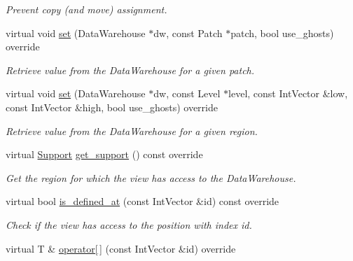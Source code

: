 \begin{DoxyCompactItemize}
\begin{DoxyCompactList}\small\item\em Prevent copy (and move) assignment. \end{DoxyCompactList}\item 
virtual void \hyperlink{classUintah_1_1PhaseField_1_1detail_1_1dw__fd_3_01ScalarField_3_01T_01_4_00_01STN_00_01VAR_00_011_01_4_ae718a5d7a2210592ec2b5dbd7eab1ace}{set} (Data\+Warehouse $\ast$dw, const Patch $\ast$patch, bool use\+\_\+ghosts) override
\begin{DoxyCompactList}\small\item\em Retrieve value from the Data\+Warehouse for a given patch. \end{DoxyCompactList}\item 
virtual void \hyperlink{classUintah_1_1PhaseField_1_1detail_1_1dw__fd_3_01ScalarField_3_01T_01_4_00_01STN_00_01VAR_00_011_01_4_a403e762e621c14b27ecc024308b32b44}{set} (Data\+Warehouse $\ast$dw, const Level $\ast$level, const Int\+Vector \&low, const Int\+Vector \&high, bool use\+\_\+ghosts) override
\begin{DoxyCompactList}\small\item\em Retrieve value from the Data\+Warehouse for a given region. \end{DoxyCompactList}\item 
virtual \hyperlink{classUintah_1_1PhaseField_1_1Support}{Support} \hyperlink{classUintah_1_1PhaseField_1_1detail_1_1dw__fd_3_01ScalarField_3_01T_01_4_00_01STN_00_01VAR_00_011_01_4_a7171f44368a08fb35192a7c9e05b25d8}{get\+\_\+support} () const override
\begin{DoxyCompactList}\small\item\em Get the region for which the view has access to the Data\+Warehouse. \end{DoxyCompactList}\item 
virtual bool \hyperlink{classUintah_1_1PhaseField_1_1detail_1_1dw__fd_3_01ScalarField_3_01T_01_4_00_01STN_00_01VAR_00_011_01_4_abd0db288b2cc873ba3205b69d94cf158}{is\+\_\+defined\+\_\+at} (const Int\+Vector \&id) const override
\begin{DoxyCompactList}\small\item\em Check if the view has access to the position with index id. \end{DoxyCompactList}\item 
virtual T \& \hyperlink{classUintah_1_1PhaseField_1_1detail_1_1dw__fd_3_01ScalarField_3_01T_01_4_00_01STN_00_01VAR_00_011_01_4_a06e82e1468aa38aad7a2237a2830ebc6}{operator\mbox{[}$\,$\mbox{]}} (const Int\+Vector \&id) override

\end{DoxyCompactItemize}
